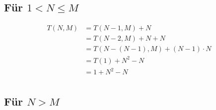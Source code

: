 \documentclass[parskip=half,a4paper]{scrartcl}
\begin{document}
\subsection*{Für $1 < N \le M$}


\begin{equation*}
\begin{aligned}
    T\left(N, M\right) & =  T\left(N-1, M\right) + N\\
& = T\left(N-2, M\right) + N + N\\
& = T\left(N-\left(N-1\right), M\right) + \left(N-1\right) \cdot N\\
& = T\left(1\right) + N^2 - N\\
& = 1 + N^2 - N\\
\end{aligned}
\end{equation*}

\subsection*{Für $N > M$}
\end{document}

